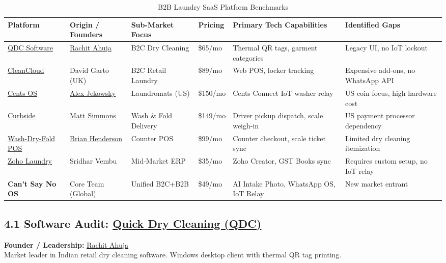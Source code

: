 \documentclass[11pt,a4paper]{article}
\begin{document}
\begin{table}[h!]
\centering
\scriptsize
\begin{tabularx}{\textwidth}{XXXXXX}
\toprule
\textbf{Platform} & \textbf{Origin / Founders} & \textbf{Sub-Market Focus} & \textbf{Pricing} & \textbf{Primary Tech Capabilities} & \textbf{Identified Gaps} \\
\midrule
\href{https://quickdrycleaning.com}{\underline{QDC Software}} & \href{https://www.linkedin.com/in/rachit-ahuja-71285b12/}{\underline{Rachit Ahuja}} & B2C Dry Cleaning & \$65/mo & Thermal QR tags, garment categories & Legacy UI, no IoT lockout \\
\href{https://cleancloudapp.com}{\underline{CleanCloud}} & David Garto (UK) & B2C Retail Laundry & \$89/mo & Web POS, locker tracking & Expensive add-ons, no WhatsApp API \\
\href{https://trycents.com}{\underline{Cents OS}} & \href{https://www.linkedin.com/in/alexjekowsky/}{\underline{Alex Jekowsky}} & Laundromats (US) & \$150/mo & Cents Connect IoT washer relay & US coin focus, high hardware cost \\
\href{https://curbsidelaundries.com}{\underline{Curbside}} & \href{https://www.linkedin.com/in/mattsimmons88/}{\underline{Matt Simmons}} & Wash \& Fold Delivery & \$149/mo & Driver pickup dispatch, scale weigh-in & US payment processor dependency \\
\href{https://washdryfoldpos.com}{\underline{Wash-Dry-Fold POS}} & \href{https://www.linkedin.com/in/brianhenderson/}{\underline{Brian Henderson}} & Counter POS & \$99/mo & Counter checkout, scale ticket sync & Limited dry cleaning itemization \\
\href{https://www.zoho.com/crm/}{\underline{Zoho Laundry}} & Sridhar Vembu & Mid-Market ERP & \$35/mo & Zoho Creator, GST Books sync & Requires custom setup, no IoT relay \\
{\color{greenaccent}\textbf{Can't Say No OS}} & Core Team (Global) & Unified B2C+B2B & \$49/mo & AI Intake Photo, WhatsApp OS, IoT Relay & New market entrant \\
\bottomrule
\end{tabularx}
\caption{B2B Laundry SaaS Platform Benchmarks}
\end{table}

\clearpage

\subsection{4.1 Software Audit: \href{https://quickdrycleaning.com}{\underline{Quick Dry Cleaning (QDC)}}}
\textbf{Founder / Leadership:} \href{https://www.linkedin.com/in/rachit-ahuja-71285b12/}{\underline{Rachit Ahuja}}\\
Market leader in Indian retail dry cleaning software. Windows desktop client with thermal QR tag printing.
\end{document}
